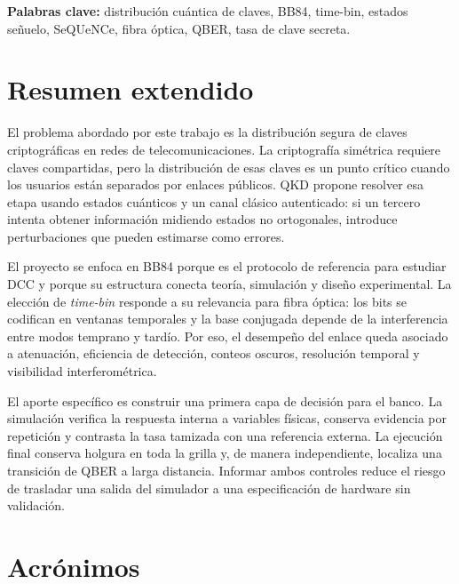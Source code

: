 \textbf{Palabras clave:} distribución cuántica de claves, BB84, time-bin, estados señuelo, SeQUeNCe, fibra óptica, QBER, tasa de clave secreta.

\chapter*{Resumen extendido}
{}

El problema abordado por este trabajo es la distribución segura de claves criptográficas en redes de telecomunicaciones. La criptografía simétrica requiere claves compartidas, pero la distribución de esas claves es un punto crítico cuando los usuarios están separados por enlaces públicos. QKD propone resolver esa etapa usando estados cuánticos y un canal clásico autenticado: si un tercero intenta obtener información midiendo estados no ortogonales, introduce perturbaciones que pueden estimarse como errores.

El proyecto se enfoca en BB84 porque es el protocolo de referencia para estudiar DCC y porque su estructura conecta teoría, simulación y diseño experimental. La elección de \textit{time-bin} responde a su relevancia para fibra óptica: los bits se codifican en ventanas temporales y la base conjugada depende de la interferencia entre modos temprano y tardío. Por eso, el desempeño del enlace queda asociado a atenuación, eficiencia de detección, conteos oscuros, resolución temporal y visibilidad interferométrica.

El aporte específico es construir una primera capa de decisión para el banco. La simulación verifica la respuesta interna a variables físicas, conserva evidencia por repetición y contrasta la tasa tamizada con una referencia externa. La ejecución final conserva holgura en toda la grilla y, de manera independiente, localiza una transición de QBER a larga distancia. Informar ambos controles reduce el riesgo de trasladar una salida del simulador a una especificación de hardware sin validación.

\chapter*{Acrónimos}
{}

